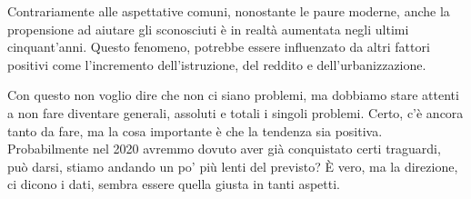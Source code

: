 \documentclass[12pt]{book} %
\begin{document}
Contrariamente alle aspettative comuni, nonostante le paure moderne, anche la propensione ad aiutare gli sconosciuti è in realtà aumentata negli ultimi cinquant’anni. Questo fenomeno, potrebbe essere influenzato da altri fattori positivi come l’incremento dell’istruzione, del reddito e  dell’urbanizzazione.

Con questo non voglio dire che non ci siano problemi, ma dobbiamo stare attenti a non fare diventare generali, assoluti
e totali i singoli problemi. Certo, c'è ancora tanto da fare, ma la cosa importante è che la
tendenza sia positiva. Probabilmente nel 2020 avremmo dovuto aver già conquistato certi traguardi, può darsi, stiamo
andando un po' più lenti del previsto? È vero, ma la direzione, ci dicono i dati, sembra essere quella giusta in tanti
aspetti.
\end{document}

